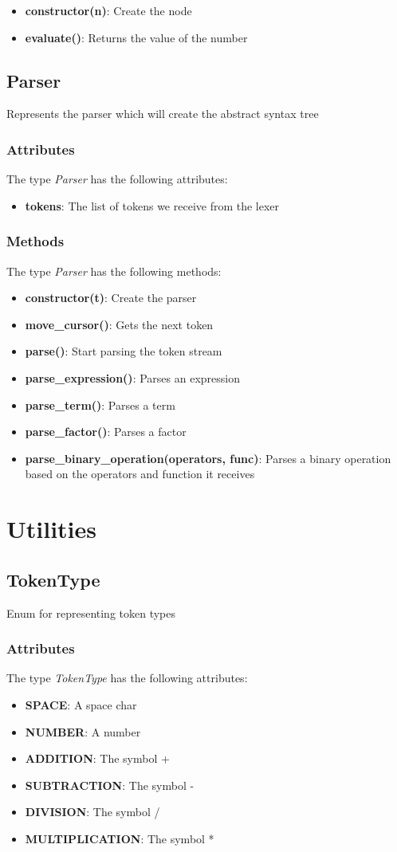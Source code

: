 \documentclass{article}
\begin{document}
\begin{itemize}\item {\bf constructor(n)}:  Create the node 
\item {\bf evaluate()}:  Returns the value of the number 
\end{itemize}\subsection{Parser}
 Represents the parser which will create the abstract syntax tree \subsubsection*{Attributes}
The type {\it Parser} has the following attributes:

\begin{itemize}
\item {\bf tokens}:  The list of tokens we receive from the lexer 
\end{itemize}
\subsubsection*{Methods}
The type {\it Parser} has the following methods:

\begin{itemize}\item {\bf constructor(t)}:  Create the parser 
\item {\bf move\_cursor()}:  Gets the next token 
\item {\bf parse()}:  Start parsing the token stream 
\item {\bf parse\_expression()}:  Parses an expression 
\item {\bf parse\_term()}:  Parses a term 
\item {\bf parse\_factor()}:  Parses a factor 
\item {\bf parse\_binary\_operation(operators, func)}:  Parses a binary operation based on the operators and function it receives 
\end{itemize}\section{Utilities}\subsection{TokenType}
 Enum for representing token types \subsubsection*{Attributes}
The type {\it TokenType} has the following attributes:

\begin{itemize}
\item {\bf SPACE}:  A space char 
\item {\bf NUMBER}:  A number 
\item {\bf ADDITION}:  The symbol + 
\item {\bf SUBTRACTION}:  The symbol - 
\item {\bf DIVISION}:  The symbol / 
\item {\bf MULTIPLICATION}:  The symbol * 
\end{itemize}
\end{document}
